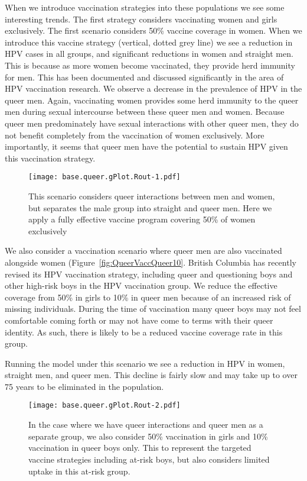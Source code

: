 \documentclass[12pt]{article}
\begin{document}
When we introduce vaccination strategies into these populations we see some interesting trends.  The first strategy considers vaccinating women and girls exclusively.  The first scenario considers 50\% vaccine coverage in women.  When we introduce this vaccine strategy (vertical, dotted grey line) we see a reduction in HPV cases in all groups, and significant reductions in women and straight men.  This is because as more women become vaccinated, they provide herd immunity for men.  This has been documented and discussed significantly in the area of HPV vaccination research.  We observe a decrease in the prevalence of HPV in the queer men.  Again, vaccinating women provides some herd immunity to the queer men during sexual intercourse between these queer men and women.  Because queer men predominately have sexual interactions with other queer men, they do not benefit completely from the vaccination of women exclusively.  More importantly, it seems that queer men have the potential to sustain HPV given this vaccination strategy.

\begin{figure}
\begin{center}
\texttt{[image: base.queer.gPlot.Rout-1.pdf]}
\caption{This scenario considers queer interactions between men and women, but separates the male group into straight and queer men.  Here we apply a fully effective vaccine program covering 50\% of women exclusively}
\label{queerVaccWomen50}
\end{center}
\end{figure}

We also consider a vaccination scenario where queer men are also vaccinated alongside women (Figure~\ref{fig:QueerVaccQueer10}.  British Columbia has recently revised its HPV vaccination strategy, including queer and questioning boys and other high-risk boys in the HPV vaccination group.  We reduce the effective coverage from 50\% in girls to 10\% in queer men because of an increased risk of missing individuals.  During the time of vaccination many queer boys may not feel comfortable coming forth or may not have come to terms with their queer identity.  As such, there is likely to be a reduced vaccine coverage rate in this group.

Running the model under this scenario we see a reduction in HPV in women, straight men, and queer men.  This decline is fairly slow and may take up to over 75 years to be eliminated in the population.  

\begin{figure}[h!]
\begin{center}
\texttt{[image: base.queer.gPlot.Rout-2.pdf]}
\caption{In the case where we have queer interactions and queer men as a separate group, we also consider 50\% vaccination in girls and 10\% vaccination in queer boys only.  This to represent the targeted vaccine strategies including at-risk boys, but also considers limited uptake in this at-risk group.}
\label{fig:queerVaccQueer10}
\end{center}
\end{figure}
\end{document}
